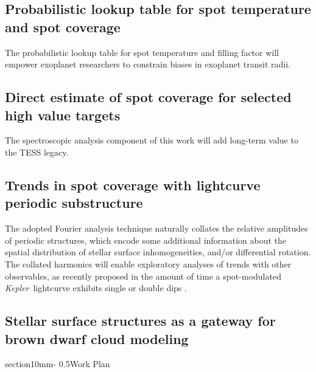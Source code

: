 \documentclass[letterpaper,11pt]{article}
\makeatletter
\renewcommand{\section}{\@startsection%
{section}{1}{0mm}{-\baselineskip}%
{0.5\baselineskip}{\normalfont\Large\bfseries}}%
\newcommand{\kepler}{{\it Kepler}}
\makeatother
\begin{document}
\subsection{Probabilistic lookup table for spot temperature and spot coverage}
The probabilistic lookup table for spot temperature and filling factor will empower exoplanet researchers to constrain biases in exoplanet transit radii.

\subsection{Direct estimate of spot coverage for selected high value targets}
The spectroscopic analysis component of this work will add long-term value to the TESS legacy.

\subsection{Trends in spot coverage with lightcurve periodic substructure}
The adopted Fourier analysis technique naturally collates the relative amplitudes of periodic structures, which encode some additional information about the spatial distribution of stellar surface inhomogeneities, and/or differential rotation.  The collated harmonics will enable exploratory analyses of trends with other observables, as recently proposed in the amount of time a spot-modulated \kepler\ lightcurve exhibits single or double dips \citep{2018ApJ...863..190B}.

\subsection{Stellar surface structures as a gateway for brown dwarf cloud modeling}

\section{Work Plan}
\end{document}
